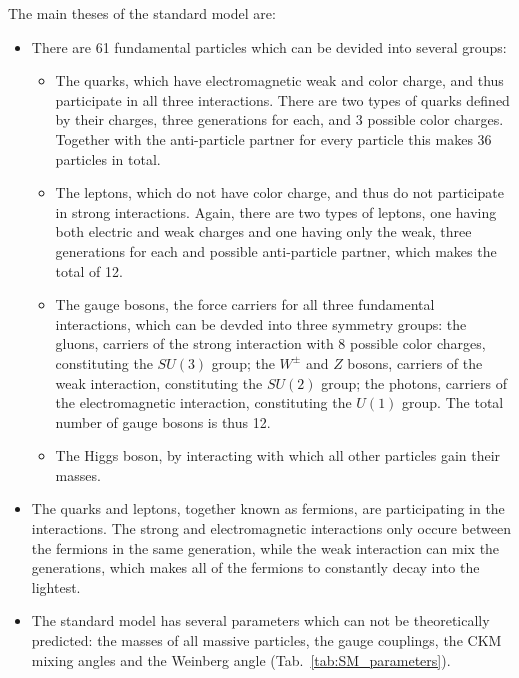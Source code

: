 The main theses of the standard model are:
\begin{itemize}
\item There are 61 fundamental particles which can be devided into several groups:
\begin{itemize}
\item The quarks, which have electromagnetic weak and color charge, and thus participate in all three interactions. There are two types of quarks defined by their charges, three generations for each, and 3 possible color charges. Together with the anti-particle partner for every particle this makes 36 particles in total.
\item The leptons, which do not have color charge, and thus do not participate in strong interactions. Again, there are two types of leptons, one having both electric and weak charges and one having only the weak, three generations for each and possible anti-particle partner, which makes the total of 12.
\item The gauge bosons, the force carriers for all three fundamental interactions, which can be devded into three symmetry groups: the gluons, carriers of the strong interaction with 8 possible color charges, constituting the $SU(3)$ group; the $W^{\pm}$ and $Z$ bosons, carriers of the weak interaction, constituting the $SU(2)$ group; the photons, carriers of the electromagnetic interaction, constituting the $U(1)$ group. The total number of gauge bosons is thus 12.
\item The Higgs boson, by interacting with which all other particles gain their masses.
\end{itemize}
\item The quarks and leptons, together known as fermions, are participating in the interactions. The strong and electromagnetic interactions only occure between the fermions in the same generation, while the weak interaction can mix the generations, which makes all of the fermions to constantly decay into the lightest.
\item The standard model has several parameters which can not be theoretically predicted: the masses of all massive particles, the gauge couplings, the CKM mixing angles and the Weinberg angle (Tab.~\ref{tab:SM_parameters}).
\end{itemize}

